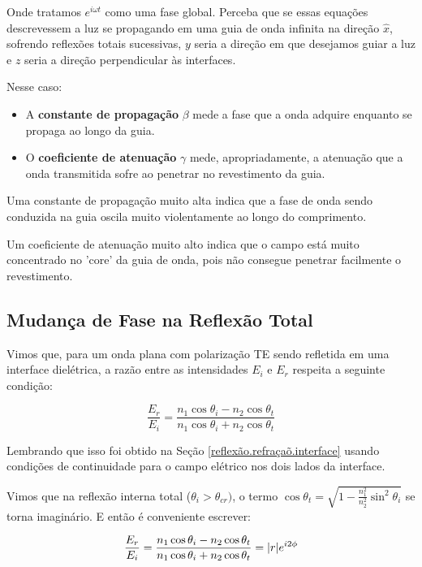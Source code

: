 \documentclass[12pt,a4paper]{report}
\begin{document}
Onde tratamos $e^{i\omega t}$ como uma fase global. Perceba que se essas equações descrevessem a luz se propagando em uma guia de onda infinita na direção $\hat{x}$, sofrendo reflexões totais sucessivas, $y$ seria a direção em que desejamos guiar a luz e $z$ seria a direção perpendicular às interfaces.

Nesse caso:
\begin{itemize}
    \item A \textbf{constante de propagação }$\beta$ mede a fase que a onda adquire enquanto se propaga ao longo da guia.
    \item O \textbf{coeficiente de atenuação} $\gamma$ mede, apropriadamente, a atenuação que a onda transmitida sofre ao penetrar no revestimento da guia.
\end{itemize}

Uma constante de propagação muito alta indica que a fase de onda sendo conduzida na guia oscila muito violentamente ao longo do comprimento.

Um coeficiente de atenuação muito alto indica que o campo está muito concentrado no 'core' da guia de onda, pois não consegue penetrar facilmente o revestimento.

\subsection{Mudança de Fase na Reflexão Total}

Vimos que, para um onda plana com polarização TE sendo refletida em uma interface dielétrica, a razão entre as intensidades $E_i$ e $E_r$ respeita a seguinte condição:

\begin{equation*}
    \frac{E_r}{E_i}=\frac{n_1\cos\theta_i-n_2\cos\theta_t}{n_1\cos\theta_i+n_2\cos\theta_t}
\end{equation*}

Lembrando que isso foi obtido na Seção \ref{reflexão.refraçaõ.interface} usando condições de continuidade para o campo elétrico nos dois lados da interface.

Vimos que na reflexão interna total ($\theta_i>\theta_{cr})$, o termo $\cos\theta_t=\sqrt{1-\frac{n_1^2}{n_2^2}\sin^2\theta_i}$ se torna imaginário. E então é conveniente escrever:

\begin{equation*}
   \frac{E_r}{E_i}=\frac{n_1\cos\theta_i-n_2\cos\theta_t}{n_1\cos\theta_i+n_2\cos\theta_t}=\abs{r}e^{i2\phi}
\end{equation*}
\end{document}
